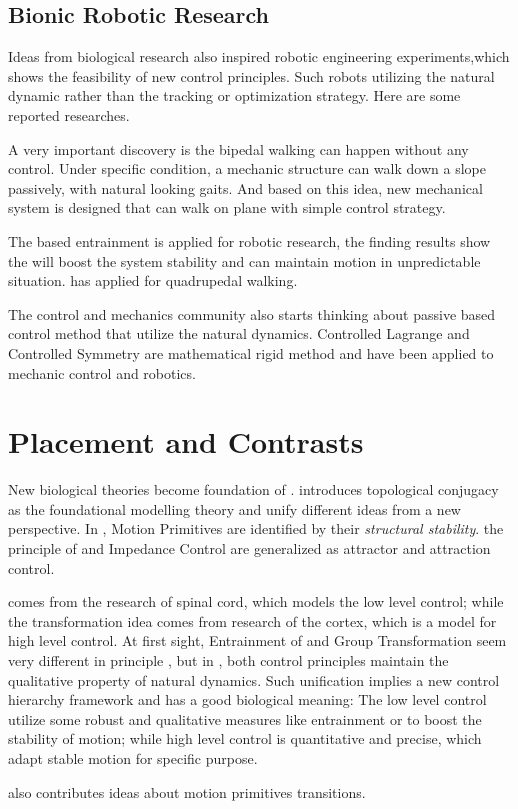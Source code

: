 \subsection{Bionic Robotic Research}
Ideas from biological research  also inspired robotic engineering experiments,which shows the feasibility of new control principles.
Such robots utilizing the natural dynamic rather than the tracking or optimization strategy.
Here are some reported researches.
\begin{itemize}
A very important discovery is the bipedal walking can happen without any control\citep{McGeer1990}.  
Under specific condition, a mechanic structure can walk down a slope passively, with natural looking gaits.
And based on this idea, new mechanical system is designed that can walk on plane with simple control strategy\citep{Collins2005}.

The \cpg based entrainment is applied for robotic research\citep{Williamson1999a}, the finding results show the \cpg will boost the system stability and can maintain motion in unpredictable situation.
\citet{fukuoka2003adaptive} has applied \cpg for quadrupedal walking.

The control and mechanics community also starts thinking about passive based control method that utilize the natural dynamics.
Controlled Lagrange \citep{bloch2000controlled,bloch2001controlled,bloch2000potential}and Controlled Symmetry \citep{spong1998underactuated,Spong96energybased} are mathematical rigid method and have been applied to mechanic control and robotics\citep{spong2005controlled}.
\end{itemize}

\section{Placement and Contrasts}
New biological theories become foundation of \moit.
 \moit introduces topological conjugacy as the foundational modelling theory  and unify different ideas from a new  perspective.
In \moit, Motion Primitives are identified by their \emph{structural stability}.
the principle of \eph and Impedance Control are generalized as attractor and attraction control.

\cpg comes from the research of spinal cord, which models the low level control; while the transformation idea comes from research of the cortex, which is a model for high level control.
At first sight, Entrainment of \cpg and Group Transformation seem very different in principle , but  in \moit, both control principles maintain the qualitative property of natural dynamics.
Such unification implies a new control hierarchy framework and has a good biological meaning: 
The low level control utilize some robust and qualitative measures like entrainment or \cpg to boost the stability of motion;
while high level control is quantitative and  precise, which adapt stable motion for specific purpose.

\moit also contributes ideas about  motion primitives transitions.


 

 



